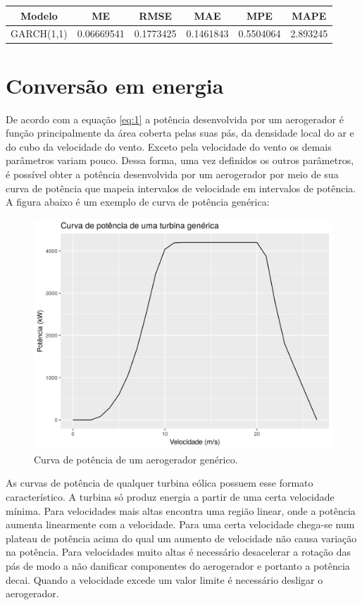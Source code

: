 \documentclass[
	12pt,				%
	openright,			%
	oneside,			%
	a4paper,			%
	english,			%
	french,				%
	spanish,			%
	brazil				%
	]{abntex2}
\begin{document}
\begin{table}[h]
\centering
\begin{tabular}{ |c|c|c|c|c|c| } 
\hline
\textbf{Modelo}&\textbf{ME}&\textbf{RMSE}&\textbf{MAE}&\textbf{MPE}&\textbf{MAPE}\\
\hline
GARCH(1,1)&0.06669541&0.1773425&0.1461843&0.5504064&2.893245\\
\hline
\end{tabular}
\end{table}

\chapter{Conversão em energia}

De acordo com a equação \ref{eq:1} a potência desenvolvida por um aerogerador é função principalmente da área coberta pelas suas pás, da densidade local do ar e do cubo da velocidade do vento. Exceto pela velocidade do vento os demais parâmetros variam pouco. Dessa forma, uma vez definidos os outros parâmetros, é possível obter a potência desenvolvida por um aerogerador por meio de sua curva de potência que mapeia intervalos de velocidade em intervalos de potência. A figura abaixo é um exemplo de curva de potência genérica:

\begin{figure}[h]
    \centering
	\includegraphics[width=\textwidth]{power_curve}
	\caption{Curva de potência de um aerogerador genérico.}
\end{figure}
\FloatBarrier

As curvas de potência de qualquer turbina eólica possuem esse formato característico. A turbina só produz energia a partir de uma certa velocidade mínima. Para velocidades mais altas encontra uma região linear, onde a potência aumenta linearmente com a velocidade. Para uma certa velocidade chega-se num plateau de potência acima do qual um aumento de velocidade não causa variação na potência. Para velocidades muito altas é necessário desacelerar a rotação das pás de modo a não danificar componentes do aerogerador e portanto a potência decai. Quando a velocidade excede um valor limite é necessário desligar o aerogerador.
\end{document}
